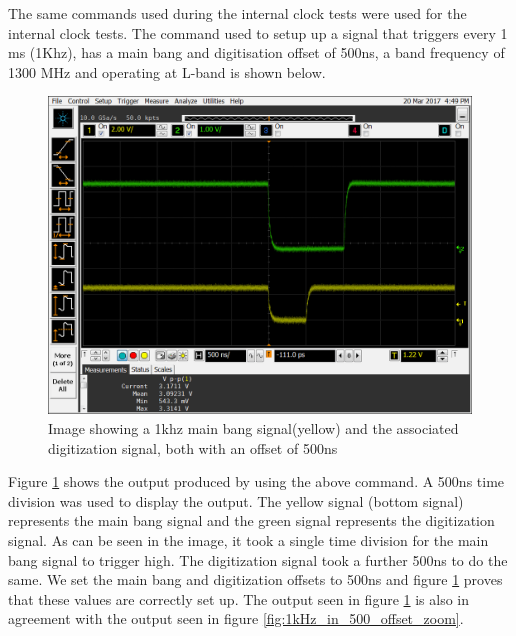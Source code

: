 \documentclass[12pt, a4paper]{article}
\begin{document}
The same commands used during the internal clock tests were used for the internal clock tests. The command used to setup up a signal that triggers every 1 ms (1Khz), has a main bang and digitisation offset of 500ns, a band frequency of 1300 MHz and operating at L-band is shown below. 


	\begin{figure}[t]
		\centering
		\includegraphics[width=13cm]{1khz_ext_mb_500ns}
		\caption{Image showing a 1khz main bang signal(yellow) and the associated digitization signal, both with an offset of 500ns}
		\label{fig:1khz_sig_ext}
	\end{figure}

Figure \ref{fig:1khz_sig_ext} shows the output produced by using the above command. A 500ns time division was used to display the output. The yellow signal (bottom signal) represents the main bang signal and the green signal represents the digitization signal. As can be seen in the image, it took a single time division for the main bang signal to trigger high. The digitization signal took a further 500ns to do the same. We set the main bang and digitization offsets to 500ns and figure \ref{fig:1khz_sig_ext} proves that these values are correctly set up. The output seen in figure \ref{fig:1khz_sig_ext} is also in agreement with the output seen in figure \ref{fig:1kHz_in_500_offset_zoom}. 
\end{document}
